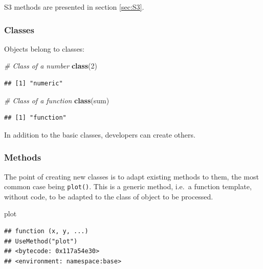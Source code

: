 \documentclass[
  12pt,
  american,
  a4paper,
  extrafontsizes,onecolumn,openright
  ]{memoir}
\newenvironment{Shaded}{\begin{snugshade}}{\end{snugshade}}
\newcommand{\CommentTok}[1]{\textcolor[rgb]{0.56,0.35,0.01}{\textit{#1}}}
\newcommand{\DecValTok}[1]{\textcolor[rgb]{0.00,0.00,0.81}{#1}}
\newcommand{\FunctionTok}[1]{\textcolor[rgb]{0.13,0.29,0.53}{\textbf{#1}}}
\newcommand{\NormalTok}[1]{#1}
\begin{document}
S3 methods are presented in section \ref{sec:S3}.

\subsubsection{Classes}\label{classes}

Objects belong to classes:

\scriptsize

\begin{Shaded}
\begin{Highlighting}[]
\CommentTok{\# Class of a number}
\FunctionTok{class}\NormalTok{(}\DecValTok{2}\NormalTok{)}
\end{Highlighting}
\end{Shaded}

\begin{verbatim}
## [1] "numeric"
\end{verbatim}

\begin{Shaded}
\begin{Highlighting}[]
\CommentTok{\# Class of a function}
\FunctionTok{class}\NormalTok{(sum)}
\end{Highlighting}
\end{Shaded}

\begin{verbatim}
## [1] "function"
\end{verbatim}

\normalsize

In addition to the basic classes, developers can create others.

\subsubsection{Methods}\label{methods}

The point of creating new classes is to adapt existing methods to them, the most common case being \texttt{plot()}.
This is a generic method, i.e.~a function template, without code, to be adapted to the class of object to be processed.

\scriptsize

\begin{Shaded}
\begin{Highlighting}[]
\NormalTok{plot}
\end{Highlighting}
\end{Shaded}

\begin{verbatim}
## function (x, y, ...) 
## UseMethod("plot")
## <bytecode: 0x117a54e30>
## <environment: namespace:base>
\end{verbatim}
\end{document}
